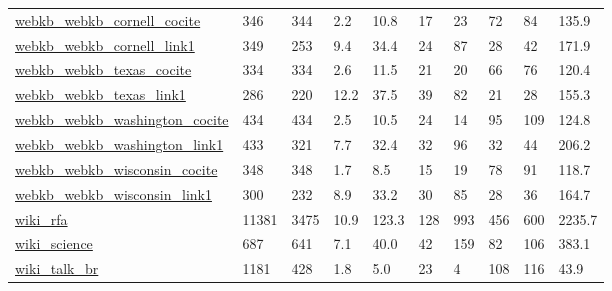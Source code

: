 \begin{longtable}{llllllllll}
 \href{http://netkit-srl.sourceforge.net/data.html}{webkb\_webkb\_cornell\_cocite}                                             & 346        & 344   & 2.2    & 10.8   & 17    & 23     & 72     & 84     & 135.9   \\
 \href{http://netkit-srl.sourceforge.net/data.html}{webkb\_webkb\_cornell\_link1}                                              & 349        & 253   & 9.4    & 34.4   & 24    & 87     & 28     & 42     & 171.9   \\
 \href{http://netkit-srl.sourceforge.net/data.html}{webkb\_webkb\_texas\_cocite}                                               & 334        & 334   & 2.6    & 11.5   & 21    & 20     & 66     & 76     & 120.4   \\
 \href{http://netkit-srl.sourceforge.net/data.html}{webkb\_webkb\_texas\_link1}                                                & 286        & 220   & 12.2   & 37.5   & 39    & 82     & 21     & 28     & 155.3   \\
 \href{http://netkit-srl.sourceforge.net/data.html}{webkb\_webkb\_washington\_cocite}                                          & 434        & 434   & 2.5    & 10.5   & 24    & 14     & 95     & 109    & 124.8   \\
 \href{http://netkit-srl.sourceforge.net/data.html}{webkb\_webkb\_washington\_link1}                                           & 433        & 321   & 7.7    & 32.4   & 32    & 96     & 32     & 44     & 206.2   \\
 \href{http://netkit-srl.sourceforge.net/data.html}{webkb\_webkb\_wisconsin\_cocite}                                           & 348        & 348   & 1.7    & 8.5    & 15    & 19     & 78     & 91     & 118.7   \\
 \href{http://netkit-srl.sourceforge.net/data.html}{webkb\_webkb\_wisconsin\_link1}                                            & 300        & 232   & 8.9    & 33.2   & 30    & 85     & 28     & 36     & 164.7   \\
 \href{http://snap.stanford.edu/data/wiki-RfA.html}{wiki\_rfa}                                                               & 11381      & 3475  & 10.9   & 123.3  & 128   & 993    & 456    & 600    & 2235.7  \\
 \href{https://figshare.com/articles/A_Wikipedia_Based_Map_of_Science/11638932}{wiki\_science}                               & 687        & 641   & 7.1    & 40.0   & 42    & 159    & 82     & 106    & 383.1   \\
 \href{http://konect.cc/networks/wiki_talk_ar}{wiki\_talk\_br}                                                                & 1181       & 428   & 1.8    & 5.0    & 23    & 4      & 108    & 116    & 43.9    \\

\end{longtable}
